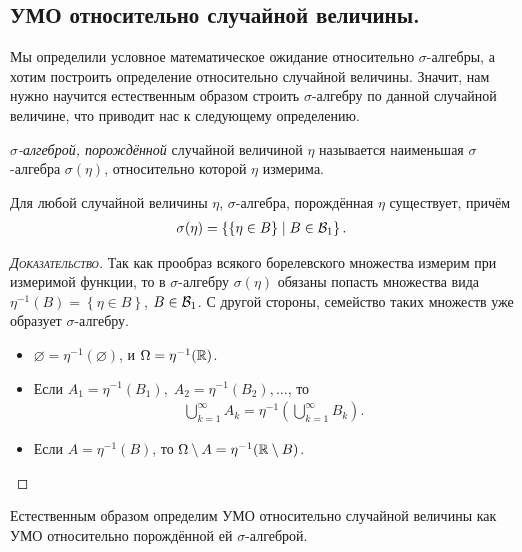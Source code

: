 \documentclass[../main.tex]{subfiles}
\begin{document}
 \subsection{УМО относительно случайной величины.}

 Мы определили условное математическое ожидание относительно $ \sigma $-алгебры, а хотим построить определение относительно случайной величины. Значит, нам нужно научится естественным образом строить $ \sigma $-алгебру по данной случайной величине, что приводит нас к следующему определению.

 \begin{df}
  \textit{$ \sigma $-алгеброй, порождённой} случайной величиной $ \eta $ называется наименьшая $ \sigma $-алгебра $ \sigma(\eta) $, относительно которой $ \eta $ измерима.
 \end{df}
 \begin{prop}
  Для любой случайной величины $ \eta $, $ \sigma $-алгебра, порождённая $ \eta $ существует, причём
  \begin{align*}
   \sigma(\eta) = \left\{ \left\{ \eta \in B \right\} \mid B \in \mathcal B_1 \right\}.
  \end{align*}
 \end{prop}
 \begin{proof}[\normalfont\textsc{Доказательство}]
  Так как прообраз всякого борелевского множества измерим при измеримой функции, то в $ \sigma $-алгебру $ \sigma(\eta) $ обязаны попасть множества вида $ \eta^{-1}(B) = \left\{ \eta \in B \right\} $, $ B \in \mathcal B_1 $. С другой стороны, семейство таких множеств уже образует $ \sigma $-алгебру.
  \begin{itemize}
   \item $ \varnothing = \eta^{-1}(\varnothing) $, и $ \Omega = \eta^{-1}(\mathbb{R}) $.
   \item Если $ A_1 = \eta^{-1}(B_1),\; A_2 = \eta^{-1}(B_2), \ldots $, то
    \begin{align*}
     \bigcup_{k=1}^{\infty} A_k = \eta^{-1} \left( \bigcup_{k=1}^{\infty} B_k \right).
    \end{align*}
   \item Если $ A = \eta^{-1}(B) $, то $ \Omega \setminus A = \eta^{-1}(\mathbb{R} \setminus B) $.
  \end{itemize}
 \end{proof}

 Естественным образом определим УМО относительно случайной величины как УМО относительно порождённой ей $ \sigma $-алгеброй.
\end{document}

